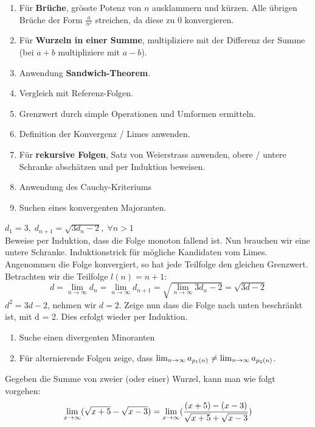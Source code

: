 \begin{enumerate}[label=(\arabic*)]
	\item Für \textbf{Brüche}, grösste Potenz von $n$ ausklammern und kürzen. Alle übrigen Brüche der Form $\frac{a}{n^s}$ streichen,
	da diese zu 0 konvergieren.
	\item Für \textbf{Wurzeln in einer Summe}, multipliziere mit der Differenz der Summe (bei $a + b$
	multipliziere mit $a - b$). 	
	\item Anwendung \textbf{Sandwich-Theorem}.
	\item Vergleich mit Referenz-Folgen.
	\item Grenzwert durch simple Operationen und Umformen ermitteln.
	\item Definition der Konvergenz / Limes anwenden.
	\item Für \textbf{rekursive Folgen}, Satz von Weierstrass anwenden, obere / untere Schranke abschätzen
	und per Induktion beweisen.
	\item Anwendung des Cauchy-Kriteriums
	\item Suchen eines konvergenten Majoranten.
\end{enumerate}

\Bsp $d_1 = 3, \; d_{n+1} = \sqrt{3d_n -2}, \; \forall n > 1$ \\
Beweise per Induktion, dass die Folge monoton fallend ist. Nun brauchen wir eine untere Schranke.
Induktionstrick für mögliche Kandidaten vom Limes. Angenommen die Folge konvergiert, so hat jede
Teilfolge den gleichen Grenzwert. Betrachten wir die Teilfolge $l(n) = n+1$:
$$d = \lim\limits_{n \to \infty} d_n =\lim\limits_{n \to \infty} d_{n+1} = \sqrt{\lim\limits_{n \to \infty} 3d_n -2} = \sqrt{3d -2}$$
$d^2 = 3d -2$, nehmen wir $d = 2$. Zeige nun dass die Folge nach unten beschränkt ist, mit d = 2.
Dies erfolgt wieder per Induktion.


\begin{enumerate}[label=(\arabic*)]
	\item Suche einen divergenten Minoranten
	\item Für alternierende Folgen zeige, dass $\lim_{n \rightarrow \infty} a_{p_1(n)} \neq \lim_{n \rightarrow \infty} a_{p_2(n)}$.
\end{enumerate}



Gegeben die Summe von zweier (oder einer) Wurzel, kann man wie folgt vorgehen:
$$\lim\limits_{x \to \infty} (\sqrt{x + 5} - \sqrt{x - 3}) = \lim\limits_{x \to \infty} (\frac{(x + 5) - (x - 3)}{\sqrt{x + 5} + \sqrt{x - 3}})$$


